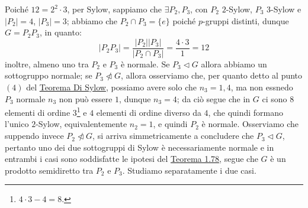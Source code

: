 \documentclass[11pt]{scrartcl}
\begin{document}
\begin{example}
    Poiché $12 = 2^2 \cdot 3$, per Sylow, sappiamo che $\exists P_2,P_3$, con $P_2$ $2$-Sylow, $P_3$ $3$-Sylow e $|P_2| = 4$, $|P_3| = 3$;
    abbiamo che $P_2 \cap P_3 = \{e\}$ poiché $p$-gruppi distinti, dunque $G = P_2P_3$, in quanto:
        \[ |P_2P_3| = \frac{|P_2||P_3|}{|P_2 \cap P_3|} = \frac{4 \cdot 3}{1} = 12
            \]
    inoltre, almeno uno tra $P_2$ e $P_3$ è normale. Se $P_3 \triangleleft G$ allora abbiamo un sottogruppo normale; se $P_3 \ntriangleleft G$, allora osserviamo che, per quanto detto al punto $(4)$
    del \hyperref[Sylow]{Teorema Di Sylow}, possiamo avere solo che $n_3 = 1,4$, ma non essnedo $P_3$ normale $n_3$ non può essere $1$, dunque $n_3 = 4$;
    da ciò segue che in $G$ ci sono $8$ elementi di ordine $3$\footnote{$4 \cdot 3 - 4 = 8$.} e $4$ elementi di ordine diverso da $4$, che quindi formano 
    l'unico $2$-Sylow, equivalentemente $n_2 = 1$, e quindi $P_2$ è normale. Osserviamo che suppendo invece $P_2 \ntriangleleft G$, si arriva simmetricamente a concludere
    che $P_3 \triangleleft G$, pertanto uno dei due sottogruppi di Sylow è necessariamente normale e in entrambi i casi sono soddisfatte le ipotesi del \hyperref[t:1.78]{Teorema 1.78},
    segue che $G$ è un prodotto semidiretto tra $P_2$ e $P_3$. Studiamo separatamente i due casi.
\end{example}
\nopagebreak 
\end{document}
